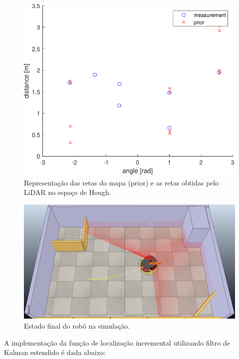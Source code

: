 \begin{figure}[H]
	\centering
	\includegraphics[width=0.65\linewidth]{img/measuement}
	\caption{Representação das retas do mapa (prior) e as retas obtidas pelo LiDAR no espaço de Hough.}
	\label{fig:measuement}
\end{figure}

\begin{figure}[H]
	\centering
	\includegraphics[width=0.9\linewidth]{img/vrep}
	\caption{Estado final do robô na simulação.}
	\label{fig:vrep}
\end{figure}

A implementação da função de localização incremental utilizando filtro de Kalman estendido é dada abaixo:

